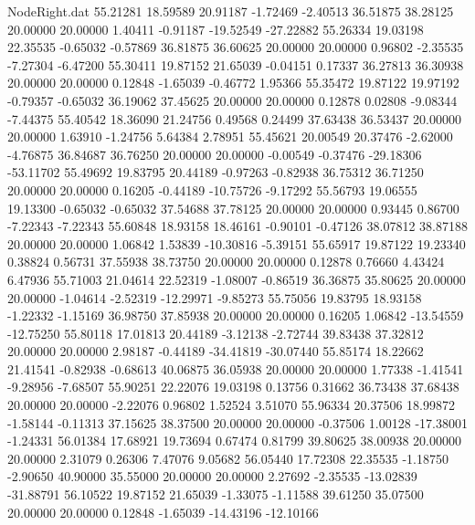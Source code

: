 \begin{filecontents}{NodeRight.dat}
  55.21281   18.59589   20.91187    -1.72469   -2.40513   36.51875   38.28125   20.00000   20.00000    1.40411   -0.91187  -19.52549  -27.22882
  55.26334   19.03198   22.35535    -0.65032   -0.57869   36.81875   36.60625   20.00000   20.00000    0.96802   -2.35535   -7.27304   -6.47200
  55.30411   19.87152   21.65039    -0.04151    0.17337   36.27813   36.30938   20.00000   20.00000    0.12848   -1.65039   -0.46772    1.95366
  55.35472   19.87122   19.97192    -0.79357   -0.65032   36.19062   37.45625   20.00000   20.00000    0.12878    0.02808   -9.08344   -7.44375
  55.40542   18.36090   21.24756     0.49568    0.24499   37.63438   36.53437   20.00000   20.00000    1.63910   -1.24756    5.64384    2.78951
  55.45621   20.00549   20.37476    -2.62000   -4.76875   36.84687   36.76250   20.00000   20.00000   -0.00549   -0.37476  -29.18306  -53.11702
  55.49692   19.83795   20.44189    -0.97263   -0.82938   36.75312   36.71250   20.00000   20.00000    0.16205   -0.44189  -10.75726   -9.17292
  55.56793   19.06555   19.13300    -0.65032   -0.65032   37.54688   37.78125   20.00000   20.00000    0.93445    0.86700   -7.22343   -7.22343
  55.60848   18.93158   18.46161    -0.90101   -0.47126   38.07812   38.87188   20.00000   20.00000    1.06842    1.53839  -10.30816   -5.39151
  55.65917   19.87122   19.23340     0.38824    0.56731   37.55938   38.73750   20.00000   20.00000    0.12878    0.76660    4.43424    6.47936
  55.71003   21.04614   22.52319    -1.08007   -0.86519   36.36875   35.80625   20.00000   20.00000   -1.04614   -2.52319  -12.29971   -9.85273
  55.75056   19.83795   18.93158    -1.22332   -1.15169   36.98750   37.85938   20.00000   20.00000    0.16205    1.06842  -13.54559  -12.75250
  55.80118   17.01813   20.44189    -3.12138   -2.72744   39.83438   37.32812   20.00000   20.00000    2.98187   -0.44189  -34.41819  -30.07440
  55.85174   18.22662   21.41541    -0.82938   -0.68613   40.06875   36.05938   20.00000   20.00000    1.77338   -1.41541   -9.28956   -7.68507
  55.90251   22.22076   19.03198     0.13756    0.31662   36.73438   37.68438   20.00000   20.00000   -2.22076    0.96802    1.52524    3.51070
  55.96334   20.37506   18.99872    -1.58144   -0.11313   37.15625   38.37500   20.00000   20.00000   -0.37506    1.00128  -17.38001   -1.24331
  56.01384   17.68921   19.73694     0.67474    0.81799   39.80625   38.00938   20.00000   20.00000    2.31079    0.26306    7.47076    9.05682
  56.05440   17.72308   22.35535    -1.18750   -2.90650   40.90000   35.55000   20.00000   20.00000    2.27692   -2.35535  -13.02839  -31.88791
  56.10522   19.87152   21.65039    -1.33075   -1.11588   39.61250   35.07500   20.00000   20.00000    0.12848   -1.65039  -14.43196  -12.10166

\end{filecontents}
